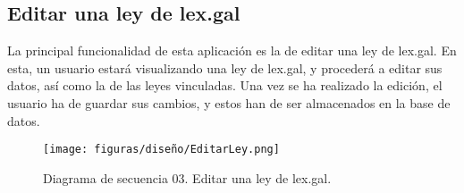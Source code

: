 \subsection{Editar una ley de lex.gal}

La principal funcionalidad de esta aplicación es la de editar una ley de lex.gal. En esta, un usuario estará visualizando una ley de lex.gal, y procederá a editar sus datos, así como la de las leyes vinculadas. Una vez se ha realizado la edición, el usuario ha de guardar sus cambios, y estos han de ser almacenados en la base de datos.

\begin{figure}[H]
\centerline{\texttt{[image: figuras/diseño/EditarLey.png]}}
\caption{Diagrama de secuencia 03. Editar una ley de lex.gal.}
\label{enlaceDEditar}
\end{figure}

